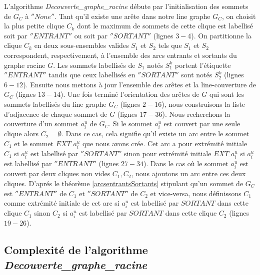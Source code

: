 L'algorithme {\em Decouverte\_graphe\_racine} d\'ebute par l'initialisation des sommets de $G_C$ \`a $''None''$.
Tant qu'il existe une ar\^ete dans notre line graphe $G_C$, on choisit la plus petite clique $C_k$ dont le maximum de sommets de cette clique est labellis\'e soit par $''ENTRANT''$ ou soit par $''SORTANT''$ (lignes $3-4$).
On partitionne la clique $C_k$  en deux sous-ensembles valides $S_1$ et $S_2$ tels que $S_1$ et $S_2$ correspondent, respectivement, \`a l'ensemble des arcs entrants et sortants du graphe racine $G$.
Les sommets labellis\'es de $S_1$ not\'es $S_1^k$ portent l'\'etiquette $''ENTRANT''$ tandis que ceux labellis\'es en $''SORTANT''$ sont not\'es $S_2^k$ (lignes $6-12$). 
Ensuite nous mettons \`a jour l'ensemble des ar\^etes et la line-couverture de $G_C$ (lignes $13-14$). 
\newline
Une fois termin\'e l'orientation des ar\^etes de $G$ qui  sont les sommets labellis\'es du line graphe $G_C$ (lignes $2-16$), nous construisons la liste d'adjacence de chaque sommet de $G$ (lignes $17-36$).
Nous recherchons la couverture d'un sommet $a_i^u$ de $G_C$.
\newline 
Si le sommet  $a_i^u$ est couvert par une seule clique alors $C_2 = \emptyset$. Dans ce cas, cela signifie qu'il existe un arc entre le sommet $C_1$ et le sommet $EXT\_a_i^u$ que nous avons cr\'ee. Cet arc a pour extr\'emit\'e initiale $C_1$ si $a_i^u$ est labellis\'e par $''SORTANT''$ sinon pour extr\'emit\'e initiale $EXT\_a_i^u$ si $a_i^u$ est labellis\'e par $''ENTRANT''$ (lignes $27-34$).
\newline
Dans le cas o\`u le sommet $a_i^u$ est couvert par deux cliques non vides $C_1, C_2$, nous ajoutons un arc entre ces deux cliques.
D'apr\'es le th\'eor\`eme  \ref{arcsentrantsSortants} stipulant qu'un sommet de $G_C$ est $''ENTRANT''$ de $C_1$ et $''SORTANT''$ de $C_2$ et vice-versa, nous d\'efinissons  $C_1$ comme extr\'emit\'e initiale de cet arc si $a_i^u$ est labellis\'e par $SORTANT$ dans cette clique $C_1$ sinon $C_2$ si $a_i^u$ est labellis\'e par $SORTANT$ dans cette clique $C_2$ (lignes $19-26$).

\subsection{Complexit\'e de l'algorithme {\em Decouverte\_graphe\_racine} }

